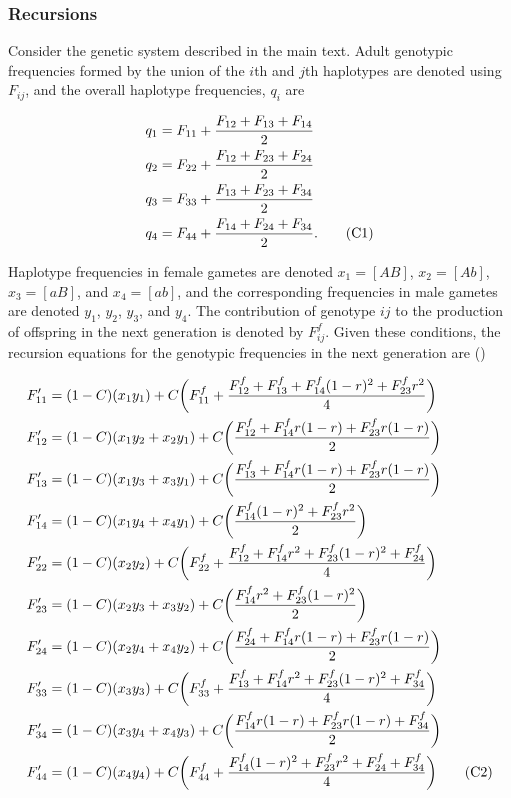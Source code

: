 \documentclass{article}
\newcommand\numberthis{\addtocounter{equation}{1}\tag{\theequation}}
\begin{document}
\subsubsection*{Recursions}

Consider the genetic system described in the main text. Adult genotypic frequencies formed by the union of the $i$th and $j$th haplotypes are denoted using $F_{ij}$, and the overall haplotype frequencies, $q_i$ are

\begin{align*}
	q_1 &= F_{11} + \frac{F_{12} + F_{13} + F_{14}}{2} \\
	q_2 &= F_{22} + \frac{F_{12} + F_{23} + F_{24}}{2} \\
	q_3 &= F_{33} + \frac{F_{13} + F_{23} + F_{34}}{2} \\
	q_4 &= F_{44} + \frac{F_{14} + F_{24} + F_{34}}{2}. \numberthis \label{eqn}
\end{align*} 

Haplotype frequencies in female gametes are denoted $x_1 = [AB]$, $x_2 = [Ab]$, $x_3 = [aB]$, and $x_4 = [ab]$, and the corresponding frequencies in male gametes are denoted $y_1$, $y_2$, $y_3$, and $y_4$. The contribution of genotype $ij$ to the production of offspring in the next generation is denoted by $F^f_{ij}$. Given these conditions, the recursion equations for the genotypic frequencies in the next generation are (\citealt{Holden1979, JordanConn2014})

\begin{align*} \label{eq:genRec}
	F'_{11} &= (1 - C) (x_1 y_1)           + C \bigg( F^f_{11} + \frac{F^f_{12} + F^f_{13} + F^f_{14}(1 - r)^2 + F^f_{23} r^2}{4} \bigg)  \\
	F'_{12} &= (1 - C) (x_1 y_2 + x_2 y_1) + C \bigg( \frac{F^f_{12} + F^f_{14} r(1-r) + F^f_{23} r(1-r)}{2} \bigg)  \\
	F'_{13} &= (1 - C) (x_1 y_3 + x_3 y_1) + C \bigg( \frac{F^f_{13} + F^f_{14} r(1-r) + F^f_{23} r(1-r)}{2} \bigg)  \\
	F'_{14} &= (1 - C) (x_1 y_4 + x_4 y_1) + C \bigg( \frac{F^f_{14} (1-r)^2 + F^f_{23} r^2}{2} \bigg)  \\
	F'_{22} &= (1 - C) (x_2 y_2)           + C \bigg( F^f_{22} + \frac{F^f_{12} + F^f_{14} r^2 + F^f_{23} (1-r)^2 + F^f_{24}}{4} \bigg)  \\
	F'_{23} &= (1 - C) (x_2 y_3 + x_3 y_2) + C \bigg( \frac{F^f_{14} r^2 + F^f_{23} (1-r)^2}{2} \bigg)  \\
	F'_{24} &= (1 - C) (x_2 y_4 + x_4 y_2) + C \bigg( \frac{F^f_{24} + F^f_{14} r(1-r) + F^f_{23} r(1-r)}{2} \bigg)  \\
	F'_{33} &= (1 - C) (x_3 y_3)           + C \bigg( F^f_{33} + \frac{F^f_{13} + F^f_{14} r^2 + F^f_{23} (1-r)^2 + F^f_{34}}{4} \bigg)  \\
	F'_{34} &= (1 - C) (x_3 y_4 + x_4 y_3) + C \bigg( \frac{F^f_{14} r(1-r) + F^f_{23} r(1-r) + F^f_{34}}{2} \bigg)  \\
	F'_{44} &= (1 - C) (x_4 y_4)           + C \bigg( F^f_{44} + \frac{F^f_{14} (1-r)^2 + F^f_{23} r^2 + F^f_{24} + F^f_{34}}{4} \bigg)  \numberthis
\end{align*}
\end{document}

